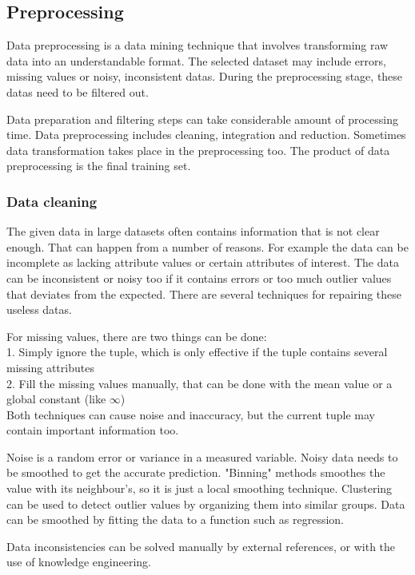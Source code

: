 \subsection{Preprocessing}

Data preprocessing is a data mining technique that involves transforming raw data into an understandable format. The selected dataset may include errors, missing values or noisy, inconsistent datas. During the preprocessing stage, these datas need to be filtered out. \smallskip

Data preparation and filtering steps can take considerable amount of processing time. Data preprocessing includes cleaning, integration and reduction. Sometimes data transformation takes place in the preprocessing too. The product of data preprocessing is the final training set.


\subsubsection{Data cleaning}

The given data in large datasets often contains information that is not clear enough. That can happen from a number of reasons. For example the data can be incomplete as lacking attribute values or certain attributes of interest. The data can be inconsistent or noisy too if it contains errors or too much outlier values that deviates from the expected. There are several techniques for repairing these useless datas.\medskip

\noindent For missing values, there are two things can be done:\\
1. Simply ignore the tuple, which is only effective if the tuple contains several missing attributes\\
2. Fill the missing values manually, that can be done with the mean value or a global constant (like $\infty$)\\
Both techniques can cause noise and inaccuracy, but the current tuple may contain important information too.\smallskip

Noise is a random error or variance in a measured variable. Noisy data needs to be smoothed to get the accurate prediction. "Binning" methods smoothes the value with its neighbour's, so it is just a local smoothing technique. Clustering can be used to detect outlier values by organizing them into similar groups. Data can be smoothed by fitting the data to a function such as regression.\smallskip

Data inconsistencies can be solved manually by external references, or with the use of knowledge engineering.


